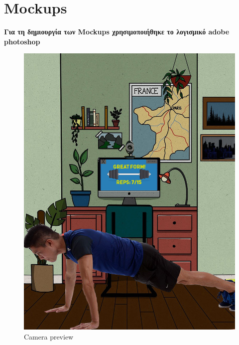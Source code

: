 \section{Mockups}
\textbf{ Για τη δημιουργία των Mockups χρησιμοποιήθηκε το λογισμικό adobe photoshop }

\begin{figure}[!htb]
  \centering
    \centering
    \includegraphics[width=\textwidth]{mockup1.jpg}
    \caption{Camera preview}
    \label{}
\end{figure}


